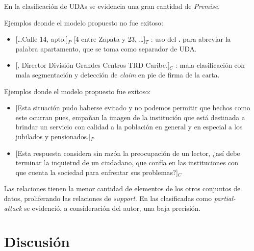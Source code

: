 \documentclass[a4paper,11pt,twocolumn,twoside]{article}
\begin{document}
En la clasificación de UDAs se evidencia una gran cantidad de \textit{Premise}.

Ejemplos deonde el modelo propuesto no fue exitoso:
\begin{itemize}
	\item \text{} [\dots Calle 14, apto.]$_P$ [4 entre Zapata y 23, \dots]$_T$
	      : uso del \textbf{.} para abreviar la palabra apartamento, que se toma como separador de UDA. %
	\item \text{} [, Director División Grandes Centros TRD Caribe.]$_C$
	      : mala clasificación con mala segmentación y detección de \textit{claim} en pie de firma de la carta. 
\end{itemize}

Ejemplos donde el modelo propuesto fue exitoso:
\begin{itemize}
	\item \text{} [Esta situación pudo haberse evitado y no podemos permitir que hechos como este ocurran pues,
		      empañan la imagen de la institución que está destinada a brindar un servicio con calidad a la población en 
		      general y en especial a los jubilados y pensionados.]$_P$ %
	\item \text{} [Esta respuesta considera sin razón la preocupación de un lector,
		      ¿así debe terminar la inquietud de un ciudadano, que confía en las instituciones con que cuenta la 
		      sociedad para enfrentar sus problemas?]$_C$ %
\end{itemize}

Las relaciones tienen la menor cantidad de elementos de los otros conjuntos de datos, proliferando
las relaciones de \textit{support}. En las clasificadas como \textit{partial-attack} se evidenció, a 
consideración del autor, una baja precisión. 

\section{Discusión}
\end{document}
